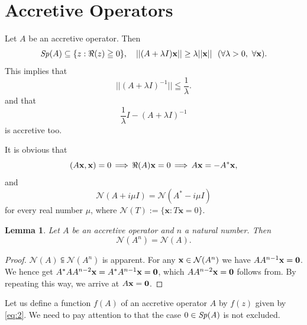 \documentclass[10pt,a4paper]{amsart}
\newtheorem{lemma}[theorem]{Lemma}
\begin{document}
\section{Accretive Operators}
Let $A$ be an accretive operator. Then 
$${\it Sp}(A)\subseteq \{z: \Re(z)\geqq 0\}, \quad  
||(A+ \lambda I)\mathbf{x}||\geq \lambda ||\mathbf{x}|| \,\,\,\, (\forall\lambda > 0, \,\, \forall\mathbf{x}).$$
 This implies that
\begin{equation}
 ||(A + \lambda I)^{-1}||\leqq \frac{1}{\lambda}. 
\label{eq:5}
\end{equation} and that   
$$\frac{1}{\lambda}I - (A + \lambda I)^{-1}$$
 is accretive too. \par
It is obvious that 
$$( A {\bf x}, {\bf x}) = 0\, \Longrightarrow \, \Re(A){\bf x} = 0\,  \Longrightarrow \,A{\bf x}= - A^*{\bf x},
$$ and  
$$\mathcal{N}(A + i \mu I) = \mathcal{N}( A^* - i\mu I)$$
for every real number $\mu$, where  
$\mathcal{N}(T):= \{\mathbf{x}: T \mathbf{x} = 0\}$. 
\begin{lemma}\label{Lem:3-1}
Let $A$ be an accretive operator and $n$ a natural number. Then 
$$\mathcal{N}(A^n) = \mathcal{N}(A).$$
\end{lemma}
\begin{proof}  $\mathcal{N}(A) \subseteqq \mathcal{N}(A^n)$ is apparent. 
For any ${\bf x} \in \mathcal{N}(A^n)$ we have $A A^{n-1} {\bf x} = {\bf 0}$. We hence 
get $A^* A A^{n-2} {\bf x} = A^* A^{n-1} {\bf x} = {\bf 0}$, which 
$A A^{n-2} {\bf x} = {\bf 0}$ follows from. By repeating this way, we arrive at  
$A {\bf x} = {\bf 0}$.
\end{proof}
Let us define a function $f(A)$ of an accretive operator $A$ by $f(z)$ given by \eqref{eq:2}. We need to 
pay attention to that the case $0\in \it{Sp}(A)$ 
is not excluded. 
\end{document}

